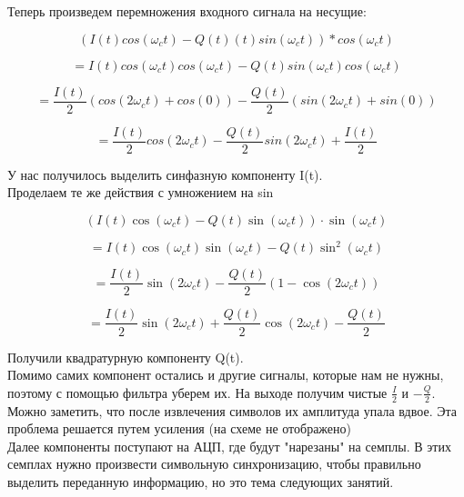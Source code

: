 Теперь произведем перемножения входного сигнала на несущие:


$$(I(t)cos(\omega_ct)-Q(t)(t)sin(\omega_ct)) * cos(\omega_ct)$$

$$= I(t)cos(\omega_ct)cos(\omega_ct) - Q(t)sin(\omega_ct)cos(\omega_ct)$$

$$= \frac{I(t)}{2}(cos(2\omega_ct) + cos(0)) - \frac{Q(t)}{2}(sin(2\omega_ct) + sin(0))$$

$$= \frac{I(t)}{2}cos(2\omega_ct) - \frac{Q(t)}{2}sin(2\omega_ct) + \boxed{\frac{I(t)}{2}}$$

У нас получилось выделить синфазную компоненту I(t). \\

Проделаем те же действия с умножением на sin

\[
(I(t)\cos(\omega_c t) - Q(t)\sin(\omega_c t)) \cdot \sin(\omega_c t)
\]

\[
= I(t)\cos(\omega_c t)\sin(\omega_c t) - Q(t)\sin^2(\omega_c t)
\]

\[
= \frac{I(t)}{2}\sin(2\omega_c t) - \frac{Q(t)}{2}(1 - \cos(2\omega_c t))
\]

\[
= \frac{I(t)}{2}\sin(2\omega_c t) + \frac{Q(t)}{2}\cos(2\omega_c t) - \boxed{\frac{Q(t)}{2}}
\]

Получили квадратурную компоненту Q(t). \\


Помимо самих компонент остались и другие сигналы, которые нам не нужны, поэтому с помощью фильтра уберем их. На выходе получим чистые
$\frac{I}{2}$ и $-\frac{Q}{2}$. Можно заметить, что после извлечения символов их амплитуда упала вдвое. Эта проблема решается
путем усиления (на схеме не отображено)\\

Далее компоненты поступают на АЦП, где будут "нарезаны" на семплы. В этих семплах нужно произвести символьную синхронизацию, чтобы правильно выделить
переданную информацию, но это тема следующих занятий.

\endinput

